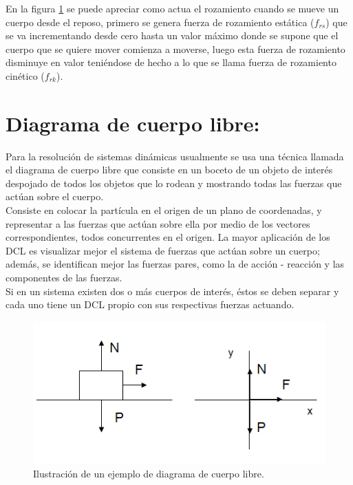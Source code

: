 En la figura \ref{frb} se puede apreciar como actua el rozamiento cuando se mueve un cuerpo desde el reposo, primero se genera 
fuerza de rozamiento estática ($f_{rs}$) que se va incrementando desde cero hasta un valor máximo donde se supone que el cuerpo 
que se quiere mover comienza a moverse, luego esta fuerza de rozamiento disminuye en valor teniéndose de hecho a lo que se llama 
fuerza de rozamiento cinético ($f_{rk}$).

\section{Diagrama de cuerpo libre:}

Para la resolución de sistemas dinámicas usualmente se usa una técnica llamada el diagrama de cuerpo libre que consiste en un 
boceto de un objeto de interés despojado de todos los objetos que lo rodean y mostrando todas las fuerzas que actúan sobre el 
cuerpo.\\

Consiste en colocar la partícula en el origen de un plano de coordenadas, y representar a las fuerzas que actúan sobre ella por 
medio de los vectores correspondientes, todos concurrentes en el origen. La mayor aplicación de los DCL es visualizar mejor el 
sistema de fuerzas que actúan sobre un cuerpo; además, se identifican mejor las fuerzas pares, como la de acción - reacción y las 
componentes de las fuerzas.\\

Si en un sistema existen dos o más cuerpos de interés, éstos se deben separar y cada uno tiene un DCL propio con sus respectivas 
fuerzas actuando.

\begin{figure}[H]
 \centering
 \includegraphics[scale=0.6]{images/cuerpo-libre.png}
 \caption{Ilustración de un ejemplo de diagrama de cuerpo libre.}\label{frb}
\end{figure}

